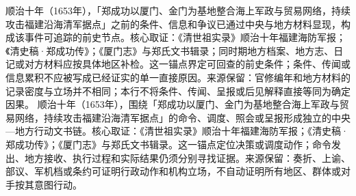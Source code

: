 顺治十年（1653年），「郑成功以厦门、金门为基地整合海上军政与贸易网络，持续攻击福建沿海清军据点」之前的条件、信息和争议已通过中央与地方材料显现，构成该事件可追踪的前史节点。核心取证：《清世祖实录》顺治十年福建海防军报；《清史稿·郑成功传》；《厦门志》与郑氏文书辑录；同时期地方档案、地方志、日记或对方材料应按具体地区补检。这一锚点界定可回查的前史条件；条件、传闻或信息累积不应被写成已经证实的单一直接原因。来源保留：官修编年和地方材料的记录密度与立场并不相同；本行不将条件、传闻、呈报或后见解释直接等同为确定因果。
顺治十年（1653年），围绕「郑成功以厦门、金门为基地整合海上军政与贸易网络，持续攻击福建沿海清军据点」的命令、调度、照会或呈报形成独立的中央—地方行动文书链。核心取证：《清世祖实录》顺治十年福建海防军报；《清史稿·郑成功传》；《厦门志》与郑氏文书辑录。这一锚点定位决策或调度动作；命令发出、地方接收、执行过程和实际结果仍须分别寻找证据。来源保留：奏折、上谕、部议、军机档或条约可证明行政动作和机构立场，不自动证明所有地区、群体或对手按其意图行动。
